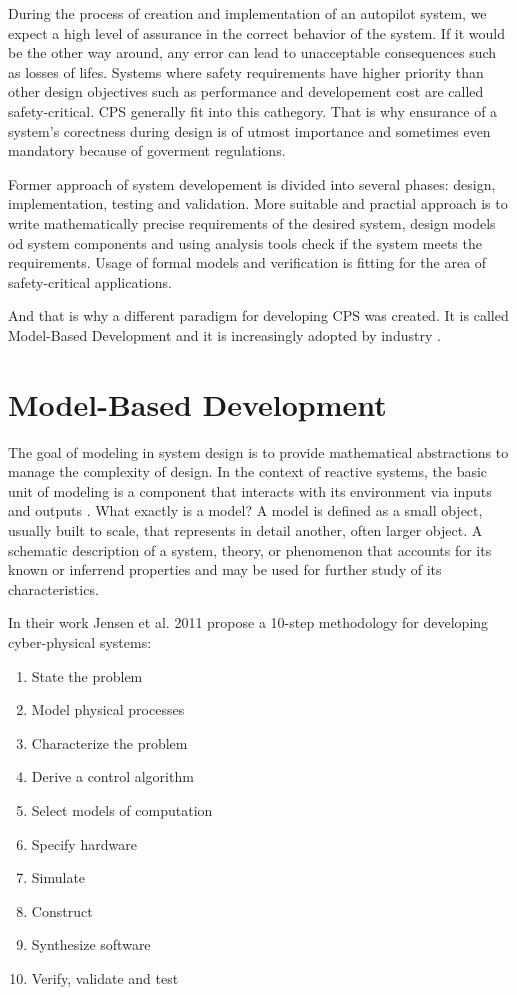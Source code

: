 During the process of creation and implementation of an autopilot system, we expect a high level of assurance in the correct behavior of the system. If it would be the other way around, any error can lead to unacceptable consequences such as losses of lifes. Systems where safety requirements have higher priority than other design objectives such as performance and developement cost are called safety-critical. CPS generally fit into this cathegory. That is why ensurance of a system's corectness during design is of utmost importance and sometimes even mandatory because of goverment regulations.


Former approach of system developement is divided into several phases: design, implementation, testing and validation. More suitable and practial approach is to write mathematically precise requirements of the desired system, design models od system components and using analysis tools check if the system meets the requirements. Usage of formal models and verification is fitting for the area of safety-critical applications. 

And that is why a different paradigm for developing CPS was created. It is called Model-Based Development and it is increasingly adopted by industry \cite{Mohalik:ModelCheckingSimulink}.

\section{Model-Based Development}

The goal of modeling in system design is to provide mathematical abstractions to manage the complexity of design. In the context of reactive systems, the basic unit of modeling is a component that interacts with its environment via inputs and outputs \cite{Rajeev:PrinciplesCPS}. What exactly is a model? A model is defined as a small object, usually built to scale, that represents in detail another, often larger object. A schematic description of a system, theory, or phenomenon that accounts for its known or inferrend properties and may be used for further study of its characteristics.

In their work Jensen et al. 2011 \cite{Lee:MBD} propose a 10-step methodology for developing cyber-physical systems:

\begin{enumerate}
	\item State the problem
	\item Model physical processes
	\item Characterize the problem
	\item Derive a control algorithm
	\item Select models of computation
	\item Specify hardware
	\item Simulate
	\item Construct
	\item Synthesize software
	\item Verify, validate and test
\end{enumerate}

